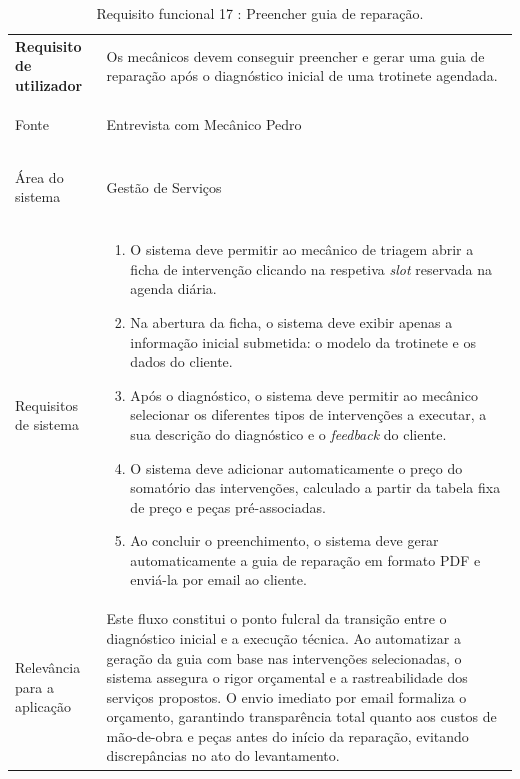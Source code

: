 \documentclass[a4paper,12pt]{scrreprt}
\begin{document}
\begin{table}[H]
    \centering
    \renewcommand{\arraystretch}{1.5} 
    
    \begin{tabular}{|>{\columncolor{gray!15}\bfseries}p{4cm}|p{10.5cm}|}
        \hline
        Requisito de utilizador & Os mecânicos devem conseguir preencher e gerar uma guia de reparação após o diagnóstico inicial de uma trotinete agendada. \\ \hdashline
        
        Fonte & Entrevista com Mecânico Pedro \\ \hdashline
        
        Área do sistema & Gestão de Serviços \\ \hdashline
        
        Requisitos de sistema & 
        \begin{enumerate}[leftmargin=*, nosep, topsep=2pt, partopsep=0pt]
            \item O sistema deve permitir ao mecânico de triagem abrir a ficha de intervenção clicando na respetiva \textit{slot} reservada na agenda diária.
            \item Na abertura da ficha, o sistema deve exibir apenas a informação inicial submetida: o modelo da trotinete e os dados do cliente.
            \item Após o diagnóstico, o sistema deve permitir ao mecânico selecionar os diferentes tipos de intervenções a executar, a sua descrição do diagnóstico e o \textit{feedback} do cliente.
            \item O sistema deve adicionar automaticamente o preço do somatório das intervenções, calculado a partir da tabela fixa de preço e peças pré-associadas.
            \item Ao concluir o preenchimento, o sistema deve gerar automaticamente a guia de reparação em formato PDF e enviá-la por email ao cliente.
        \end{enumerate} \\ \hdashline
        
        Relevância para a aplicação & Este fluxo constitui o ponto fulcral da transição entre o diagnóstico inicial e a execução técnica. Ao automatizar a geração da guia com base nas intervenções selecionadas, o sistema assegura o rigor orçamental e a rastreabilidade dos serviços propostos. O envio imediato por email formaliza o orçamento, garantindo transparência total quanto aos custos de mão-de-obra e peças antes do início da reparação, evitando discrepâncias no ato do levantamento. \\ \hline
    \end{tabular}
    \caption{Requisito funcional 17 : Preencher guia de reparação.}
    \label{tab:rf_guia_reparacao}
\end{table}
\end{document}
